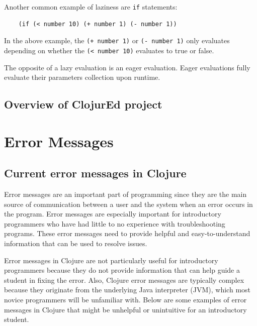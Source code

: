 \documentclass[12pt]{article}
\newcommand{\comment}[1]{{\bf \tt  {#1}}}
\newcommand{\emcomment}[1]{\textcolor{ForestGreen}{\comment{Elena: {#1}}}}
\begin{document}
Another common example of laziness are \texttt{if} statements:

\begin{verbatim}
	(if (< number 10) (+ number 1) (- number 1))
\end{verbatim}

In the above example, the \texttt{(+ number 1)} or \texttt{(- number 1)} only evaluates 
depending on
whether the \texttt{(< number 10)} evaluates to true or false.

The opposite of a lazy evaluation is an eager evaluation. Eager evaluations fully 
evaluate their
parameters collection upon runtime.


\subsection{Overview of ClojurEd project}\label{sec:project}

\section{Error Messages}\label{sec:errors}

\subsection{Current error messages in Clojure}\label{sec:currentem}
Error messages are an important part of programming since they are the main source of 
communication between a user and the system when an error occurs in the program.
Error messages are especially important for introductory programmers who have had little 
to no experience with troubleshooting programs. %
These error messages need to provide helpful and easy-to-understand information that can 
be used to resolve issues.

Error messages in Clojure are not particularly useful for introductory programmers 
because they do not provide information that can help guide a student in fixing the 
error.
Also, Clojure error messages are typically complex because they originate from the 
underlying Java interpreter (JVM), which most %
novice programmers will be unfamiliar with.
Below are some examples of error messages in Clojure that might be unhelpful or 
unintuitive for an introductory student.
\end{document}
